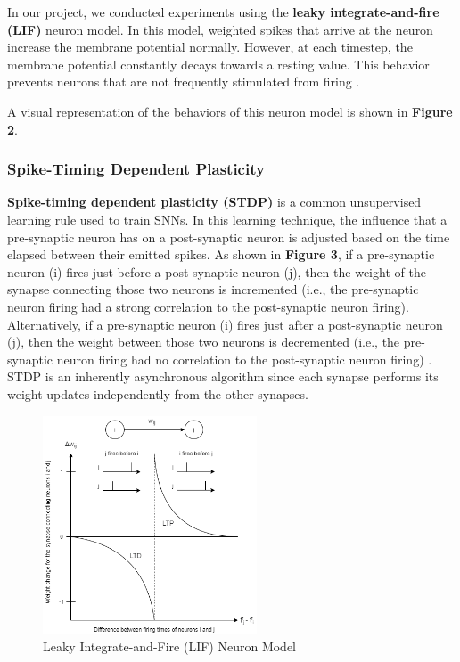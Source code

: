 \documentclass[journal]{IEEEtran}
\begin{document}
In our project, we conducted experiments using the \textbf{leaky integrate-and-fire (LIF)} neuron model. In this model, weighted spikes that arrive at the neuron increase the membrane potential normally. However, at each timestep, the membrane potential constantly decays towards a resting value. This behavior prevents neurons that are not frequently stimulated from firing \cite{burkitt2006review}.

A visual representation of the behaviors of this neuron model is shown in \textbf{Figure 2}.

% 
\subsubsection{Spike-Timing Dependent Plasticity}

\textbf{Spike-timing dependent plasticity (STDP)} is a common unsupervised learning rule used to train SNNs. In this learning technique, the influence that a pre-synaptic neuron has on a post-synaptic neuron is adjusted based on the time elapsed between their emitted spikes. As shown in \textbf{Figure 3}, if a pre-synaptic neuron (i) fires just before a post-synaptic neuron (j), then the weight of the synapse connecting those two neurons is incremented (i.e., the pre-synaptic neuron firing had a strong correlation to the post-synaptic neuron firing). Alternatively, if a pre-synaptic neuron (i) fires just after a post-synaptic neuron (j), then the weight between those two neurons is decremented (i.e., the pre-synaptic neuron firing had no correlation to the post-synaptic neuron firing) \cite{Sjostrom:2010}. STDP is an inherently asynchronous algorithm since each synapse performs its weight updates independently from the other synapses.

\begin{figure}[!t]
\centering
\includegraphics[width=2.5in]{stdp.png}
\caption{Leaky Integrate-and-Fire (LIF) Neuron Model}
\label{fig_sim}
\end{figure}
\end{document}
